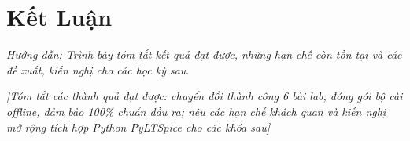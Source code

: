 \documentclass[12pt,a4paper]{report}
\begin{document}
\chapter{Kết Luận}

\textit{\color{guidegray}
Hướng dẫn: Trình bày tóm tắt kết quả đạt được, những hạn chế còn tồn tại và các đề xuất, kiến nghị cho các học kỳ sau.
}

\begin{orangebox}
\textit{\color{guidegray}[Tóm tắt các thành quả đạt được: chuyển đổi thành công 6 bài lab, đóng gói bộ cài offline, đảm bảo 100\% chuẩn đầu ra; nêu các hạn chế khách quan và kiến nghị mở rộng tích hợp Python PyLTSpice cho các khóa sau]}
\end{orangebox}
\end{document}
